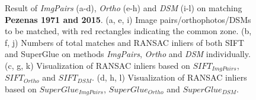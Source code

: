 \begin{figure}[htbp]
\begin{center}
{\begin{minipage}[t]{0.48\linewidth}
            \end{minipage}%
        }
        \caption{{\scriptsize Result of \textit{ImgPairs} (a-d), \textit{Ortho} (e-h) and \textit{DSM} (i-l) on matching \textbf{Pezenas 1971 and 2015}. (a, e, i) Image pairs/orthophotos/DSMs to be matched, with red rectangles indicating the common zone. (b, f, j) Numbers of total matches and RANSAC inliers of both SIFT and SuperGlue on methods \textit{ImgPairs}, \textit{Ortho} and \textit{DSM} individually. (c, g, k) Visualization of RANSAC inliers based on $SIFT_{ImgPairs}$, $SIFT_{Ortho}$ and $SIFT_{DSM}$. (d, h, l) Visualization of RANSAC inliers based on $SuperGlue_{ImgPairs}$, $SuperGlue_{Ortho}$ and $SuperGlue_{DSM}$.}}        
        \label{MatchVizPezenas1971DSM}
    \end{center}
\end{figure} 



